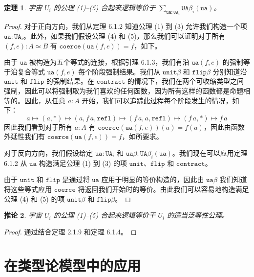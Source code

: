 \documentclass{ctexrep}
\theoremstyle{plain}
\newtheorem{theorem}{定理}[section]
\newtheorem{corollary}[theorem]{推论}
\theoremstyle{definition}
\theoremstyle{remark}
\begin{document}
\begin{theorem}
宇宙 $U_i$ 的公理 (1)--(5) 合起来逻辑等价于 $\sum_{\mathtt{ua}:\mathtt{UA}_i} \mathtt{UA}\beta_i(\mathtt{ua})$。
\end{theorem}

\begin{proof}
对于正向方向，我们从定理 6.1.2 知道公理 (1) 到 (3) 允许我们构造一个项 $\mathtt{ua} : \mathtt{UA}_i$。此外，如果我们假设公理 (4) 和 (5)，那么我们可以证明对于所有 $(f, e) : A \simeq B$ 有 $\mathtt{coerce}(\mathtt{ua}(f, e)) = f$，如下。

由于 $\mathtt{ua}$ 被构造为五个等式的连接，根据引理 6.1.3，我们有沿 $\mathtt{ua}(f, e)$ 的强制等于沿复合等式 $\mathtt{ua}(f, e)$ 每个阶段强制结果。我们从 $\mathtt{unit}\beta$ 和 $\mathtt{flip}\beta$ 分别知道沿 $\mathtt{unit}$ 和 $\mathtt{flip}$ 的强制结果。在 $\mathtt{contract}$ 的情况下，我们在两个可收缩类型之间强制，因此可以将强制取为我们喜欢的任何函数，因为所有这样的函数都是命题相等的。因此，从任意 $a : A$ 开始，我们可以追踪此过程每个阶段发生的情况，如下：
\[
a \mapsto (a, *) \mapsto (a, f\,a, \mathtt{refl}) \mapsto (f\,a, a, \mathtt{refl}) \mapsto (f\,a, *) \mapsto f\,a
\]
因此我们看到对于所有 $a : A$ 有 $\mathtt{coerce}(\mathtt{ua}(f, e))(a) = f(a)$，因此由函数外延性我们有 $\mathtt{coerce}(\mathtt{ua}(f, e)) = f$，如所要求。

对于反向方向，我们假设给定 $\mathtt{ua} : \mathtt{UA}_i$ 和 $\mathtt{ua}\beta : \mathtt{UA}\beta_i(\mathtt{ua})$。我们现在可以应用定理 6.1.2 从 $\mathtt{ua}$ 构造满足公理 (1) 到 (3) 的项 $\mathtt{unit}$、$\mathtt{flip}$ 和 $\mathtt{contract}$。

由于 $\mathtt{unit}$ 和 $\mathtt{flip}$ 是通过将 $\mathtt{ua}$ 应用于明显的等价构造的，因此由 $\mathtt{ua}\beta$ 我们知道将这些等式应用 $\mathtt{coerce}$ 将返回我们开始时的等价。由此我们可以容易地构造满足公理 (4) 和 (5) 的项 $\mathtt{unit}\beta$ 和 $\mathtt{flip}\beta$。
\end{proof}

\begin{corollary}
宇宙 $U_i$ 的公理 (1)--(5) 合起来逻辑等价于 $U_i$ 的适当泛等性公理。
\end{corollary}

\begin{proof}
通过结合定理 2.1.9 和定理 6.1.4。
\end{proof}

\section{在类型论模型中的应用}
\end{document}
